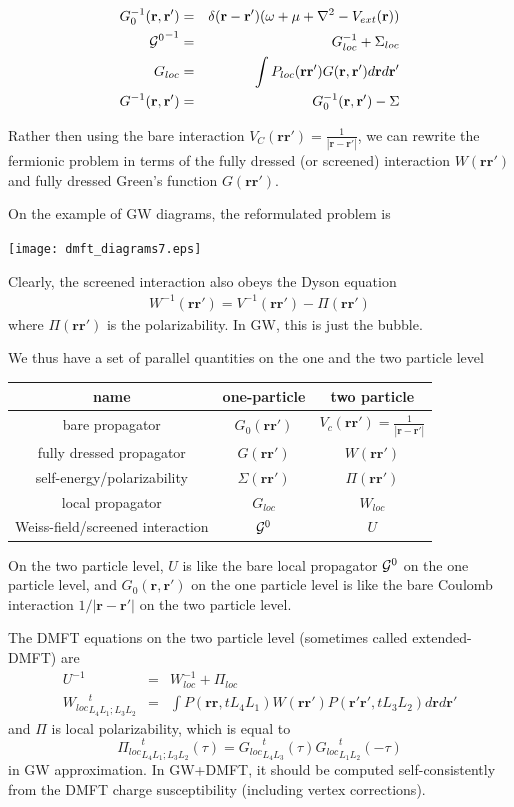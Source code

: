 \documentclass[usenames,letter,landscape,semhelv]{seminar}
\newcommand{\vr}{{\mathbf{r}}}
\begin{document}
\begin{slide}
\begin{eqnarray}
G_0^{-1}(\vr,\vr') &=& \delta(\vr-\vr')(\omega+\mu+\nabla^2-V_{ext}(\vr))\\
{{\cal G}^{0}}^{-1} &=& G_{loc}^{-1} + \Sigma_{loc}\\
G_{loc} &=& \int P_{loc}(\vr\vr') G(\vr,\vr') d\vr d\vr'\\
G^{-1}(\vr,\vr') &=& G_0^{-1}(\vr,\vr') - \Sigma
\end{eqnarray}


Rather then using the bare interaction
$V_C(\vr\vr')=\frac{1}{|\vr-\vr'|}$, we can rewrite the fermionic
problem in terms of the fully dressed (or screened) interaction
$W(\vr\vr')$ and fully dressed Green's function $G(\vr\vr')$.

On the example of GW diagrams, the reformulated problem is

\texttt{[image: dmft\_diagrams7.eps]}

Clearly, the screened interaction also obeys the Dyson equation
\begin{eqnarray}
W^{-1}(\vr\vr') =  V^{-1}(\vr\vr') - \Pi(\vr\vr')
\end{eqnarray}
where $\Pi(\vr\vr')$ is the polarizability. In GW, this is just the
bubble.

We thus have a set of parallel quantities on the one and the two
particle level
\begin{tabular}{c|cc}
name & one-particle & two particle\\
\hline
bare propagator & $G_0(\vr\vr')$ & $V_c(\vr\vr')=\frac{1}{|\vr-\vr'|}$\\
fully dressed propagator & $G(\vr\vr')$ & $W(\vr\vr')$\\
self-energy/polarizability & $\Sigma(\vr\vr')$ & $\Pi(\vr\vr')$\\
local propagator & $G_{loc}$ & $W_{loc}$\\
Weiss-field/screened interaction & ${\cal G}^0$ & $U$
\end{tabular}




On the two particle level, $U$ is like the bare local propagator
${\cal G}^0$ on the one particle level, and $G_0(\vr,\vr')$ on the one
particle level is like the bare Coulomb interaction $1/|\vr-\vr'|$ on
the two particle level.



The DMFT equations on the two particle level (sometimes called
extended-DMFT) are
\begin{eqnarray}
U^{-1} &=& W_{loc}^{-1} + \Pi_{loc}\\  
{W_{loc}}^t_{L_4 L_1; L_3 L_2} &=& \int P(\vr\vr,t L_4 L_1) W(\vr\vr')P(\vr'\vr',t L_3 L_2)d\vr d\vr'
\end{eqnarray}
and $\Pi$ is local polarizability, which is equal to
\begin{equation}
{\Pi_{loc}}^t_{ L_4 L_1; L_3 L_2}(\tau) =  {G_{loc}}^t_{L_4 L_3}(\tau) {G_{loc}}^t_{L_1 L_2}(-\tau)
\end{equation}
in GW approximation. In GW+DMFT, it should be computed
self-consistently from the DMFT charge susceptibility (including vertex corrections).




\end{slide}
\end{document}
